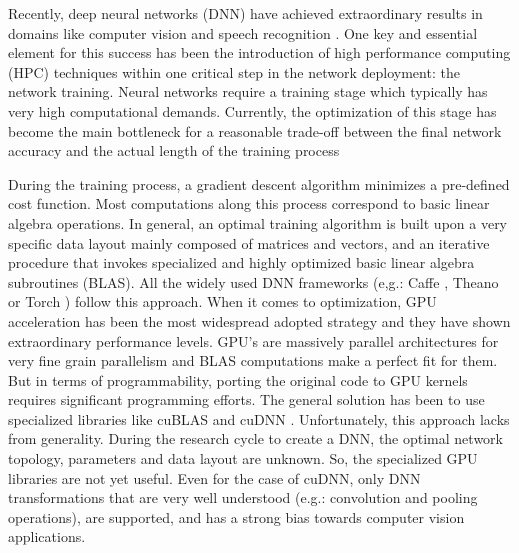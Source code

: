 Recently, deep neural networks (DNN) have achieved extraordinary 
results in domains like computer vision and speech recognition \cite{ILSVRC15, Hannun2014}. 
One key and essential element for this success
has been the introduction of high performance computing (HPC)
techniques within one critical step in the network deployment: the
network training. 
Neural networks require a training stage which typically has
very high computational demands. 
Currently, the optimization of this stage
has become the main bottleneck for a reasonable trade-off between the
final network accuracy and the actual length of the
training process \cite{JeffDean2012, Coates2013} 


During the training process, a gradient descent algorithm minimizes a pre-defined cost function. 
Most computations
along this process correspond to basic linear algebra operations. In
general, an optimal training algorithm is built upon a very specific 
data layout mainly composed of matrices and vectors, and an iterative
procedure that invokes specialized and highly optimized basic
linear algebra subroutines (BLAS).
All the widely used DNN frameworks (e,g.: Caffe \cite{Caffe}, Theano \cite{Theano} or Torch \cite{Torch}) follow this approach. 
When it comes to optimization, 
GPU acceleration has been the most widespread adopted strategy and they have
shown extraordinary performance levels. 
GPU's are massively
parallel architectures for very fine grain parallelism and BLAS
computations make a perfect fit for them. 
But in terms of programmability,
porting the original code to GPU kernels requires significant programming 
efforts. 
The general solution has been to use specialized 
libraries like cuBLAS and cuDNN \cite{chetlur2014cudnn} . 
Unfortunately, this approach lacks from generality.
During the research cycle to create a DNN, the optimal network topology,
parameters and data layout are unknown. 
So, the specialized GPU libraries are not yet useful. 
Even for the case of cuDNN, 
only DNN transformations that are very well understood 
(e.g.: convolution and pooling operations),
are supported, and has a strong bias towards computer vision applications.


